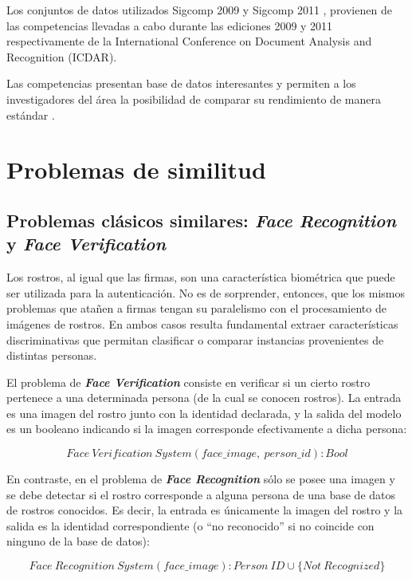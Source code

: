 Los conjuntos de datos utilizados Sigcomp 2009 \cite{sigcomp2009} y Sigcomp 2011 \cite{sigcomp2009}, provienen de las competencias llevadas a cabo durante las ediciones 2009 y 2011 respectivamente de la International Conference on
Document Analysis and Recognition (ICDAR).

Las competencias presentan base de datos interesantes y permiten a los investigadores del área la posibilidad de comparar su rendimiento de manera estándar \cite{tesis-parodi}.



\section{Problemas de similitud}

\subsection{Problemas clásicos similares: \textit{Face Recognition} y \textit{Face Verification}}

Los rostros, al igual que las firmas, son una característica biométrica que puede ser utilizada para la autenticación. No es de sorprender, entonces, que los mismos problemas que atañen a firmas tengan su paralelismo con el procesamiento de imágenes de rostros. En ambos casos resulta fundamental extraer características discriminativas que permitan clasificar o comparar instancias provenientes de distintas personas.

El problema de \textbf{\textit{Face Verification}} consiste en verificar si un cierto rostro pertenece a una determinada persona (de la cual se conocen rostros). La entrada es una imagen del rostro junto con la identidad declarada, y la salida del modelo es un booleano indicando si la imagen corresponde efectivamente a dicha persona:

\begin{equation*}
    Face \ Verification \ System (face\_image, \ person\_id ) : Bool
\end{equation*}

En contraste, en el problema de \textit{\textbf{Face Recognition}} sólo se posee una imagen y se debe detectar si el rostro corresponde a alguna persona de una base de datos de rostros conocidos. Es decir, la entrada es únicamente la imagen del rostro y la salida es la identidad correspondiente (o ``no reconocido'' si no coincide con ninguno de la base de datos):

\begin{equation*}
    Face \ Recognition \ System (face\_image) :  Person \ ID \cup \{ Not\ Recognized \}
\end{equation*}

